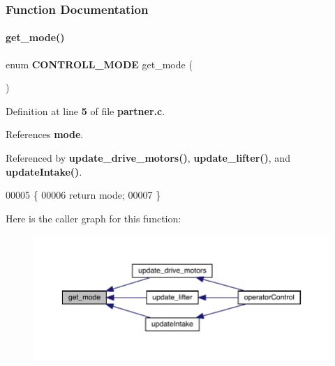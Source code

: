 \subsubsection{Function Documentation}
\mbox{\label{partner_8c_aacc86d07e59d3b919f5c5eae2ce5d404}} 
\paragraph{get\+\_\+mode()}
{\footnotesize\ttfamily enum \textbf{ C\+O\+N\+T\+R\+O\+L\+L\+\_\+\+M\+O\+DE} get\+\_\+mode (\begin{DoxyParamCaption}{ }\end{DoxyParamCaption})}



Definition at line \textbf{ 5} of file \textbf{ partner.\+c}.



References \textbf{ mode}.



Referenced by \textbf{ update\+\_\+drive\+\_\+motors()}, \textbf{ update\+\_\+lifter()}, and \textbf{ update\+Intake()}.


\begin{DoxyCode}
00005                               \{
00006   \textcolor{keywordflow}{return} mode;
00007 \}
\end{DoxyCode}
Here is the caller graph for this function\+:\nopagebreak
\begin{figure}[H]
\begin{center}
\leavevmode
\includegraphics[width=350pt]{partner_8c_aacc86d07e59d3b919f5c5eae2ce5d404_icgraph}
\end{center}
\end{figure}
\mbox{\label{partner_8c_ab2c78903a76d2ed8969271803c78368a}} 
